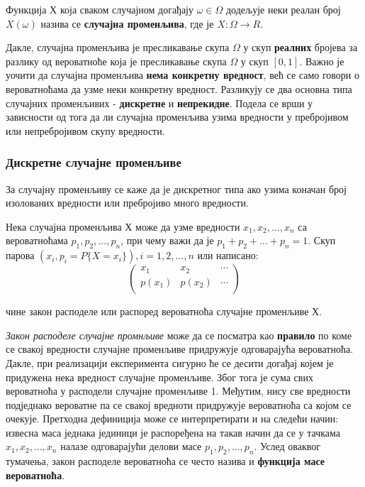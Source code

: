 \begin{de}
Функција $Х$ која сваком случајном догађају $\omega \in \Omega $ додељује неки реалан број $X(\omega)$ назива се \textbf{случајна променљива}, где је $X:\Omega \longrightarrow R$.
\end{de}

Дакле, случајна променљива је пресликавање скупа $\Omega $ у скуп \textbf{реалних} бројева за разлику од вероватноће која је пресликавање скупа  $\Omega $ у скуп $ [0,1]$. Важно је уочити да случајна променљива \textbf{нема конкретну вредност}, већ се само говори о вероватноћама да узме неки конкретну вредност. Разликују се два основна типа случајних променљивих - \textbf{дискретне} и \textbf{непрекидне}. Подела се врши у зависности од тога да ли случајна променљива узима вредности у пребројивом или непребројивом скупу вредности.


\subsubsection{Дискретне случајне променљиве}

За случајну променљиву се каже да је дискретног типа ако узима коначан број изолованих вредности или пребројиво много вредности.

\begin{de}
Нека случајна променљива $Х$ може да узме вредности $x_1,x_2, ... , x_n$ са вероватноћама $p_1,p_2, ... ,p_n$, при чему важи да је $p_1 + p_2 + ... + p_n = 1$. Скуп парова $(x_i,p_i = P\lbrace X=x_i \rbrace), i=1,2,...,n$ или написано:
$$ 
\left(
\begin{array}{ccc}
x_1 & x_2 & \cdots \\
p(x_1) & p(x_2) & \cdots \\
\end{array}
\right)
$$

чине закон расподеле или распоред вероватноћа случајне променљиве $Х$.
\end{de}

\textit{Закон расподеле случајне промнљиве} може да се посматра као \textbf{правило} по коме се свакој вредности случајне променљиве придружује одговарајућа вероватноћа. Дакле, при реализацији експеримента сигурно ће се десити догађај којем је придужена нека вредност случајне променљиве. Због тога је сума свих вероватноћа у расподели случајне променљиве 1. Међутим, нису све вредности подједнако вероватне па се свакој вредноти придружује вероватноћа са којом се очекује.
Претходна дефиниција може се интерпретирати и на следећи начин: извесна маса једнака јединици је распоређена на такав начин да се у тачкама $x_1,x_2, ... , x_n$ налазе одговарајући делови масе $p_1,p_2, ... ,p_n$. Услед оваквог тумачења, закон расподеле вероватноћа се често назива и \textbf{функција масе вероватноћа}.

